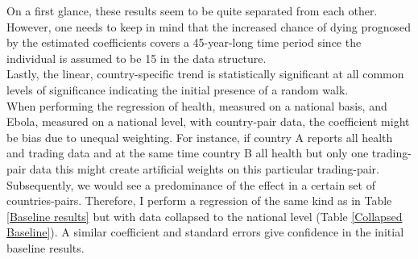 \documentclass{article}
\begin{document}
On a first glance, these results seem to be quite separated from each other. However, one needs to keep in mind that the increased chance of dying prognosed by the estimated coefficients covers a 45-year-long time period since the individual is assumed to be 15 in the \cite{whostatistics} data structure.\\
Lastly, the linear, country-specific trend is statistically significant at all common levels of significance indicating the initial presence of a random walk. \\
When performing the regression of health, measured on a national basis, and Ebola, measured on a national level, with country-pair data, the coefficient might be bias due to unequal weighting. For instance, if country A reports all health and trading data and at the same time country B all health but only one trading-pair data this might create artificial weights on this particular trading-pair. Subsequently, we would see a predominance of the effect in a certain set of countries-pairs. Therefore, I perform a regression of the same kind as in Table \ref{Baseline results} but with data collapsed to the national level (Table \ref{Collapsed Baseline}). A similar coefficient and standard errors give confidence in the initial baseline results. 
\end{document}
